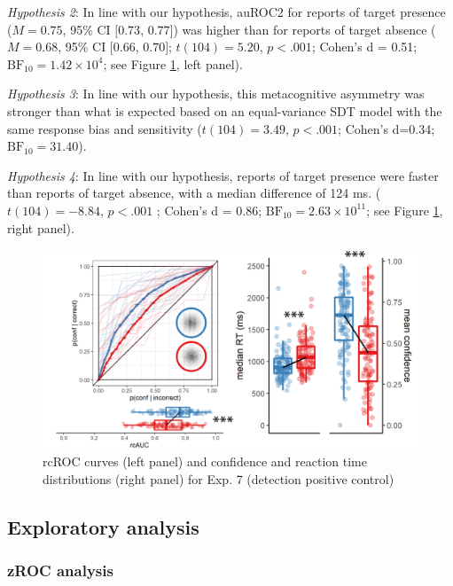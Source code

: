 \documentclass[12pt,twoside]{reedthesis}
\begin{document}
\emph{Hypothesis 2}: In line with our hypothesis, auROC2 for reports of target presence (\(M = 0.75\), 95\% CI \([0.73\), \(0.77]\)) was higher than for reports of target absence (\(M = 0.68\), 95\% CI \([0.66\), \(0.70]\); \(t(104) = 5.20\), \(p < .001\); Cohen's d = 0.51; \(\mathrm{BF}_{\textrm{10}} = 1.42 \times 10^{4}\); see Figure \ref{fig:asymmetry-rcROC7}, left panel).

\emph{Hypothesis 3}: In line with our hypothesis, this metacognitive asymmetry was stronger than what is expected based on an equal-variance SDT model with the same response bias and sensitivity (\(t(104) = 3.49\), \(p < .001\); Cohen's d=0.34; \(\mathrm{BF}_{\textrm{10}} = 31.40\)).

\emph{Hypothesis 4}: In line with our hypothesis, reports of target presence were faster than reports of target absence, with a median difference of 124 ms. (\(t(104) = -8.84\), \(p < .001\) ; Cohen's d = 0.86; \(\mathrm{BF}_{\textrm{10}} = 2.63 \times 10^{11}\); see Figure \ref{fig:asymmetry-rcROC7}, right panel).
\begin{figure}
\includegraphics[width=1\linewidth]{figure/asymmetry/results7} \caption[Results from Experiment 7 (positive control)]{rcROC curves (left panel) and confidence and reaction time distributions (right panel) for Exp. 7 (detection positive control)}\label{fig:asymmetry-rcROC7}
\end{figure}
\hypertarget{exploratory-analysis}{%
\subsection{Exploratory analysis}\label{exploratory-analysis}}

\hypertarget{zroc-analysis}{%
\subsubsection*{zROC analysis}\label{zroc-analysis}}
\end{document}
